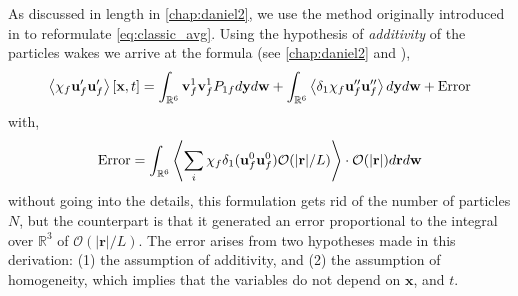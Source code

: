 As discussed in length in \ref{chap:daniel2}, we use the method originally introduced in \citet{batchelor1972sedimentation} to reformulate \ref{eq:classic_avg}. 
Using the hypothesis of \textit{additivity} of the particles wakes we arrive at the formula (see \ref{chap:daniel2} and \citet{batchelor1972sedimentation}), 
\begin{align}
    \avg{\chi_f \textbf{u}_f' \textbf{u}_f'}[\textbf{x},t] =
    \int_{\mathbb{R}^6}
    \textbf{v}_f^1
    \textbf{v}_f^1
    P_{1f}
    d\textbf{y}
    d\textbf{w}
    + 
    \int_{\mathbb{R}^6}
    \avg{\delta_1 \chi_f\textbf{u}_f'' \textbf{u}_f''}
    d\textbf{y}
    d\textbf{w}
    +
    \text{Error}
    \label{eq:batchlor_avg}
\end{align}
with, 
\begin{equation}
    \text{Error}
    = 
    \int_{\mathbb{R}^6}
    \avg{\sum_i
    \chi_f\delta_1 (\textbf{u}_f^0\textbf{u}_f^0) \mathcal{O}(|\textbf{r}|/L)
    }
    \cdot\mathcal{O}(|\textbf{r}|)
    d\textbf{r}
    d\textbf{w}
    \label{eq:error}
\end{equation}
without going into the details, this formulation gets rid of the number of particles $N$, but the counterpart is that it generated an error proportional to the integral over $\mathbb{R}^3$ of $\mathcal{O}(|\textbf{r}|/L)$.
The error arises from two hypotheses made in this derivation: (1) the assumption of additivity, and (2) the assumption of homogeneity, which implies that the variables do not depend on $\textbf{x}$, and $t$. 


